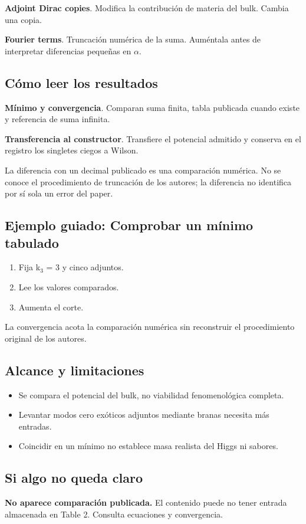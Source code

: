 \documentclass[11pt,a4paper]{article}
\begin{document}
\textbf{Adjoint Dirac copies}. Modifica la contribución de materia del bulk. Cambia una copia.

\textbf{Fourier terms}. Truncación numérica de la suma. Auméntala antes de interpretar diferencias pequeñas en \ensuremath{\alpha}.

\subsection*{Cómo leer los resultados}
\textbf{Mínimo y convergencia}. Comparan suma finita, tabla publicada cuando existe y referencia de suma infinita.

\textbf{Transferencia al constructor}. Transfiere el potencial admitido y conserva en el registro los singletes ciegos a Wilson.

La diferencia con un decimal publicado es una comparación numérica. No se conoce el procedimiento de truncación de los autores; la diferencia no identifica por sí sola un error del paper.
\subsection*{Ejemplo guiado: Comprobar un mínimo tabulado}
\begin{enumerate}
\item Fija k\ensuremath{{}_{3}} = 3 y cinco adjuntos.
\item Lee los valores comparados.
\item Aumenta el corte.
\end{enumerate}
La convergencia acota la comparación numérica sin reconstruir el procedimiento original de los autores.
\subsection*{Alcance y limitaciones}
\begin{itemize}
\item Se compara el potencial del bulk, no viabilidad fenomenológica completa.
\item Levantar modos cero exóticos adjuntos mediante branas necesita más entradas.
\item Coincidir en un mínimo no establece masa realista del Higgs ni sabores.
\end{itemize}
\subsection*{Si algo no queda claro}
\textbf{No aparece comparación publicada.} El contenido puede no tener entrada almacenada en Table 2. Consulta ecuaciones y convergencia.
\end{document}
